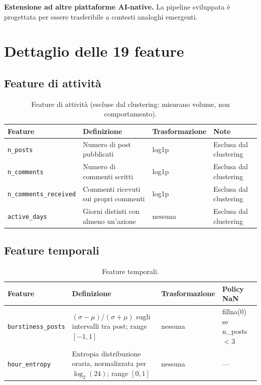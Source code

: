 \documentclass[12pt,a4paper]{report}
\newcommand{\code}[1]{\texttt{#1}}
\begin{document}
\textbf{Estensione ad altre piattaforme AI-native.} La pipeline sviluppata è progettata per essere trasferibile a contesti analoghi emergenti.

\appendix

\chapter{Dettaglio delle 19 feature}
\label{app:features}

\section{Feature di attività}

\begin{table}[H]
\centering
\caption{Feature di attività (escluse dal clustering: misurano volume, non comportamento).}
\begin{tabular}{@{}llll@{}}
\toprule
Feature & Definizione & Trasformazione & Note \\
\midrule
\code{n\_posts} & Numero di post pubblicati & log1p & Esclusa dal clustering \\
\code{n\_comments} & Numero di commenti scritti & log1p & Esclusa dal clustering \\
\code{n\_comments\_received} & Commenti ricevuti sui propri commenti & log1p & Esclusa dal clustering \\
\code{active\_days} & Giorni distinti con almeno un'azione & nessuna & Esclusa dal clustering \\
\bottomrule
\end{tabular}
\end{table}

\section{Feature temporali}

\begin{table}[H]
\centering
\caption{Feature temporali.}
\begin{tabular}{@{}lp{4.5cm}ll@{}}
\toprule
Feature & Definizione & Trasformazione & Policy NaN \\
\midrule
\code{burstiness\_posts} & $(\sigma-\mu)/(\sigma+\mu)$ sugli intervalli tra post; range $[-1,1]$ & nessuna & fillna(0) se n\_posts $< 3$ \\
\code{hour\_entropy} & Entropia distribuzione oraria, normalizzata per $\log_2(24)$; range $[0,1]$ & nessuna & --- \\
\bottomrule
\end{tabular}
\end{table}
\end{document}
